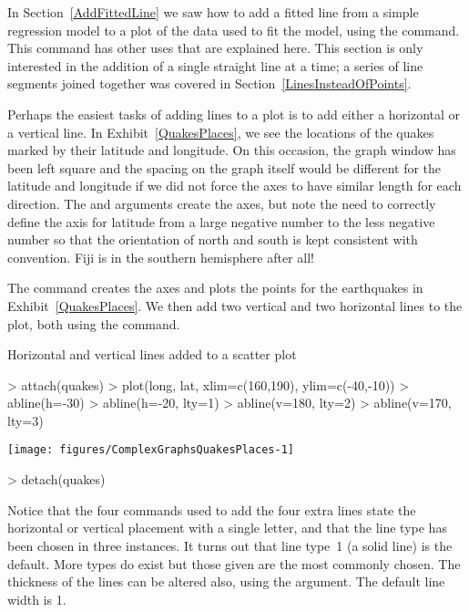 In Section~\ref{AddFittedLine} we saw how to add a fitted line from a simple regression model to a plot of the data used to fit the model, using the  command. This command has other uses that are explained here. This section is only interested in the addition of a single straight line at a time; a series of line segments joined together was covered in Section~\ref{LinesInsteadOfPoints}.

Perhaps the easiest tasks of adding lines to a plot is to add either a horizontal or a vertical line. In Exhibit~\ref{QuakesPlaces}, we see the locations of the quakes marked by their latitude and longitude. On this occasion, the graph window has been left square and the spacing on the graph itself would be different for the latitude and longitude if we did not force the axes to have similar length for each direction. The  and  arguments create the axes, but note the need to correctly define the axis for latitude from a large negative number to the less negative number so that the orientation of north and south is kept consistent with convention. Fiji is in the southern hemisphere after all!

The  command creates the axes and plots the points for the earthquakes in Exhibit~\ref{QuakesPlaces}. We then add two vertical and two horizontal lines to the plot, both using the  command.
\begin{exhibit}
\begin{center}
\caption{Horizontal and vertical lines added to a scatter plot}
\label{QuakesPlaces}
\begin{Schunk}
\begin{Sinput}
> attach(quakes)
> plot(long, lat, xlim=c(160,190), ylim=c(-40,-10))
> abline(h=-30)
> abline(h=-20, lty=1)
> abline(v=180, lty=2)
> abline(v=170, lty=3)
\end{Sinput}

\texttt{[image: figures/ComplexGraphsQuakesPlaces-1]} \begin{Sinput}
> detach(quakes)
\end{Sinput}
\end{Schunk}
\end{center}
\end{exhibit}
Notice that the four commands used to add the four extra lines state the horizontal or vertical placement with a single letter, and that the line type has been chosen in three instances. It turns out that line type~1 (a solid line) is the default. More types do exist but those given are the most commonly chosen. The thickness of the lines can be altered also, using the  argument. The default line width is 1.

